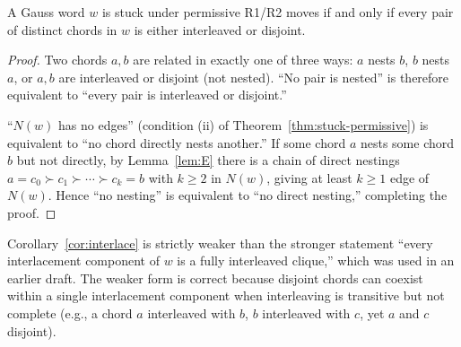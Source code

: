 \begin{corollary}
\label{cor:interlace}
A Gauss word $w$ is stuck under permissive R1/R2 moves if and only if
every pair of distinct chords in $w$ is either interleaved or
disjoint.
\end{corollary}

\begin{proof}
Two chords $a, b$ are related in exactly one of three ways: $a$
nests $b$, $b$ nests $a$, or $a, b$ are interleaved or disjoint (not
nested). ``No pair is nested'' is therefore equivalent to ``every
pair is interleaved or disjoint.''

``$N(w)$ has no edges'' (condition (ii) of Theorem~\ref{thm:stuck-permissive})
is equivalent to ``no chord directly nests another.'' If some chord
$a$ nests some chord $b$ but not directly, by Lemma~\ref{lem:E} there
is a chain of direct nestings $a = c_0 \succ c_1 \succ \cdots \succ
c_k = b$ with $k \geq 2$ in $N(w)$, giving at least $k \geq 1$ edge
of $N(w)$. Hence ``no nesting'' is equivalent to ``no direct
nesting,'' completing the proof.
\end{proof}

\begin{remark}
Corollary~\ref{cor:interlace} is strictly weaker than the stronger
statement ``every interlacement component of $w$ is a fully
interleaved clique,'' which was used in an earlier draft. The weaker
form is correct because disjoint chords can coexist within a single
interlacement component when interleaving is transitive but not
complete (e.g., a chord $a$ interleaved with $b$, $b$ interleaved
with $c$, yet $a$ and $c$ disjoint).
\end{remark}
